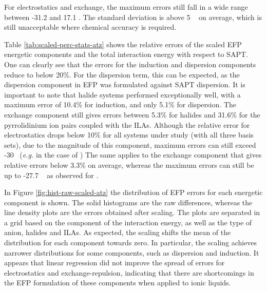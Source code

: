 For electrostatics and exchange, the maximum errors still fall in a wide range between -31.2 and 17.1 \enUnit.
The standard deviation is above 5 \enUnit~ on average, which is still unacceptable where chemical accuracy is required.


Table \ref{tab:scaled-perc-stats-atz} shows the relative errors of the scaled EFP energetic components and the total interaction energy with respect to SAPT.
One can clearly see that the errors for the induction and dispersion components reduce to below 20\%.
For the dispersion term, this can be expected, as the dispersion component in EFP was formulated against SAPT dispersion.
\cite{Adamovic2005a}
It is important to note that  halide systems performed exceptionally well, with a maximum error of 10.4\% for induction, and only 5.1\% for dispersion.
The exchange component still gives errors between 5.3\% for  halides and 31.6\% for the pyrrolidinium ion pairs coupled with the ILAs.
Although the relative error for electrostatics drops below 10\% for all systems under study (with all three basis sets), due to the magnitude of this component, maximum errors can still exceed -30 \enUnit~(\emph{e.g.} in the case of )
The same applies to the exchange component that gives relative errors below 3.3\% on average, whereas the maximum errors can still be up to -27.7 \enUnit~ as observed for .


In Figure \ref{fig:hist-raw-scaled-atz} the distribution of EFP errors for each energetic component is shown.
The solid histograms are the raw differences, whereas the line density plots are the errors obtained after scaling.
The plots are separated in a grid based on the component of the interaction energy, as well as the type of anion, halides and ILAs.
As expected, the scaling shifts the mean of the distribution for each component towards zero.
In particular, the scaling achieves narrower distributions for some components, such as dispersion and induction.
It appears that linear regression did not improve the spread of errors for electrostatics and exchange-repulsion, indicating that there are shortcomings in the EFP formulation of these components when applied to ionic liquids.


